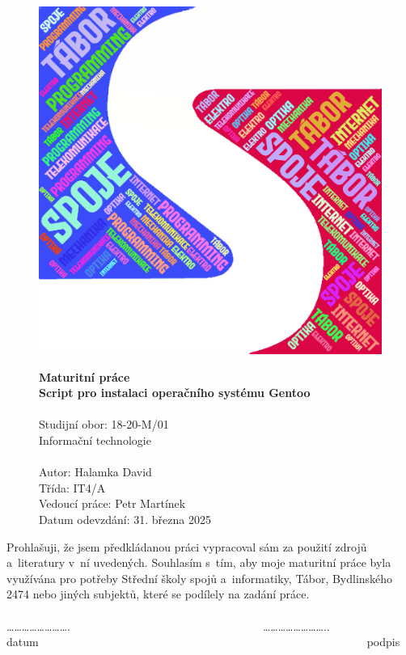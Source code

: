\documentclass[12pt,a4paper,twoside,]{article}
\begin{document}
\begin{figure}[h!]
\centering
\includegraphics[scale=0.5,]{obrazky/sssi_logo.png}


	
\textsf{\textbf{\Huge Maturitní práce\\}}
\textsf{ \textbf{\Huge Script pro instalaci operačního systému Gentoo \\}}
\textsf{ \Huge \\Studijní obor: 18-20-M/01 \\Informační technologie\\}
\textsf{\LARGE \\Autor: Halamka David\\
Třída: IT4/A\\
Vedoucí práce: Petr Martínek
}
\vspace*{7em}
\textsf{\LARGE\\
Datum odevzdání: 31. března 2025 }
\thispagestyle{empty}
\end{figure}


\newpage
\thispagestyle{empty}
Prohlašuji, že jsem předkládanou práci vypracoval sám za použití zdrojů a~literatury v~ní uvedených. Souhlasím s~tím, aby moje maturitní práce byla využívána pro potřeby Střední školy spojů a~informatiky, Tábor, Bydlinského 2474 nebo jiných subjektů, které se podílely na zadání práce.\\ 
\\	…………………….~~~~~~~~~~~~~~~~~~~~~~~~~~~~~~~~~~……………………..\\
datum~~~~~~~~~~~~~~~~~~~~~~~~~~~~~~~~~~~~~~~~~~~~~~~~~~~~~~~~~~podpis
\end{document}
